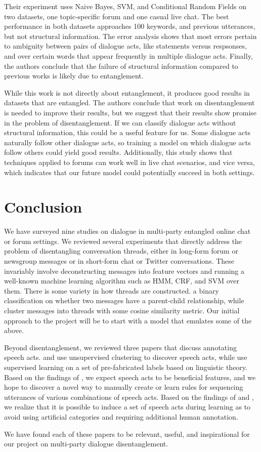 \documentclass[11pt]{article}
\begin{document}
Their experiment uses Naive Bayes, SVM, and Conditional Random Fields on two
datasets, one topic-specific forum and one casual live chat. The best
performance in both datasets approaches 100%
keywords, and previous utterances, but not structural information. The error
analysis shows that most errors pertain to ambiguity between pairs of dialogue
acts, like statements versus respsonses, and over certain words that appear
frequently in multiple dialogue acts. Finally, the authors conclude that the
failure of structural information compared to previous works is likely due to
entanglement.

While this work is not directly about entanglement, it produces good results in
datasets that are entangled. The authors conclude that work on
disentanglement is needed to improve their results, but we suggest that their
results show promise in the problem of disentanglement. If we can classify
dialogue acts without structural information, this could be a useful feature
for us. Some dialogue acts naturally follow other dialogue acts, so training a
model on which dialogue acts follow others could yield good results.
Additionally, this study shows that techniques applied to forums can work well
in live chat scenarios, and vice versa, which indicates that our future model
could potentially succeed in both settings.

\section{Conclusion}

We have surveyed nine studies on dialogue in multi-party entangled online 
chat or forum settings. We reviewed several experiments that directly address
the problem of disentangling conversation threads, either in long-form forum
or newsgroup messages or in short-form chat or Twitter conversations. These
invariably involve deconstructing messages into feature vectors and running a 
well-known machine learning algorithm such as HMM, CRF, and SVM over them.
There is some variety in how threads are constructed. \cite{Aumayr2011a}
a binary classification on whether two messages have a parent-child
relationship, while \cite{Mayfield2012a} cluster messages into threads with 
some cosine similarity metric. Our initial approach to the project will be to 
start with a model that emulates some of the above.

Beyond disentanglement, we reviewed three papers that discuss annotating 
speech acts. \cite{Ritter2010a} and \cite{Paula} use unsupervised clustering 
to discover speech acts, while \cite{Kim2012} use supervised learning on a set 
of pre-fabricated labels based on linguistic theory. Based on the findings of 
\cite{Kim2012}, we expect speech acts to be beneficial features, and we hope 
to discover a novel way to manually create or learn rules for sequencing 
utterances of various combinations of speech acts. Based on the findings of
\cite{Ritter2010a} and \cite{Paula}, we realize that it is possible to induce 
a set of speech acts during learning as to avoid using artificial categories 
and requiring additional human annotation.

We have found each of these papers to be relevant, useful, and inspirational
for our project on multi-party dialogue disentanglement.

{} 
\end{document}
